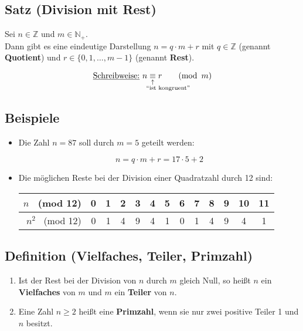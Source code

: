 \subsection[Division mit Rest]{Satz (Division mit Rest)}

	Sei $n\in\mathbb{Z}$ und $m\in\mathbb{N_+}$.\\
	Dann gibt es eine eindeutige Darstellung
	$n=q\cdot m+r$ mit $q\in \mathbb{Z}$ (genannt \textbf{Quotient})
	und $r\in\{0,1,\dots,m-1\}$ (genannt \textbf{Rest}).
	
	\[	
		\text{\underline{Schreibweise:} }n\equalexpl{``ist kongruent''}r
		\qquad(\operatorname{mod}~m)		
	\]

	
\subsection{Beispiele}
	
	\begin{itemize}

		\item Die Zahl $n=87$ soll durch $m=5$ geteilt werden:
		
		\[
			n=q\cdot m+r=17\cdot 5+2
		\]			
		
		\item Die möglichen Reste bei der Division einer Quadratzahl durch 12 sind:\\
		
		\begin{tabular}{r|c|c|c|c|c|c|c|c|c|c|c|c|}
		$n$ \ (mod 12)		& 0 & 1 & 2 & 3 & 4 & 5 & 6 & 7 & 8 & 9 & 10 & 11 \\ \hline
		$n^2$ \ (mod 12)	& 0 & 1 & 4 & 9 & 4 & 1 & 0 & 1 & 4 & 9 & 4  & 1
		\end{tabular}
	
	\end{itemize}

	
\subsection[Vielfaches, Teiler, Primzahl]{Definition (Vielfaches, Teiler, Primzahl)}

	\begin{enumerate}
		
		\item Ist der Rest bei der Division von $n$ durch $m$ gleich Null, 
		so heißt $n$ ein \textbf{Vielfaches} von $m$ und $m$ ein \textbf{Teiler} von $n$.
		
		\item Eine Zahl $n\geq 2$ heißt eine \textbf{Primzahl}, wenn sie nur 
		zwei positive Teiler 1 und $n$ besitzt.
		
	\end{enumerate}


